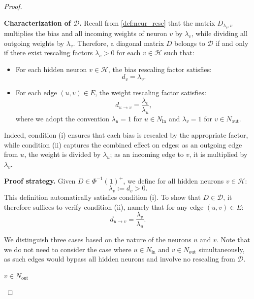 \documentclass{article}
\theoremstyle{plain}
\theoremstyle{definition}
\theoremstyle{remark}
\def\Dcal{\mathcal{D}}
\def\Dcal{{\mathcal{D}}}
\begin{document}
{\begin{proof}
\begin{itemize}
{\textbf{Characterization of $\Dcal$.} Recall from \cref{def:neur_resc} that the matrix $D_{\lambda_v, v}$ multiplies the bias and all incoming weights of neuron $v$ by $\lambda_v$, while dividing all outgoing weights by $\lambda_v$. Therefore, a diagonal matrix $D$ belongs to $\Dcal$ if and only if there exist rescaling factors $\lambda_v > 0$ for each $v \in \mathcal{H}$ such that:
\begin{itemize}
    \item[(i)] For each hidden neuron $v \in \mathcal{H}$, the bias rescaling factor satisfies:
    \begin{equation}
        d_v = \lambda_v.
    \end{equation}
    \item[(ii)] For each edge $(u,v) \in E$, the weight rescaling factor satisfies:
    \begin{equation}
    \label{eq:edge_condition}
        d_{u \rightarrow v} = \frac{\lambda_v}{\lambda_u},
    \end{equation}
    where we adopt the convention $\lambda_u = 1$ for $u \in N_{\text{in}}$ and $\lambda_v = 1$ for $v \in N_{\text{out}}$.
\end{itemize}

Indeed, condition (i) ensures that each bias is rescaled by the appropriate factor, while condition (ii) captures the combined effect on edges: as an outgoing edge from $u$, the weight is divided by $\lambda_u$; as an incoming edge to $v$, it is multiplied by $\lambda_v$.

\textbf{Proof strategy.} Given $D \in \Phi^{-1}(\mathbf{1})^+$, we define for all hidden neurons $v \in \mathcal{H}$:
\begin{equation}
    \lambda_v := d_v > 0.
\end{equation}
This definition automatically satisfies condition (i). To show that $D \in \Dcal$, it therefore suffices to verify condition (ii), namely that for any edge $(u,v) \in E$:
\begin{equation}
\label{eq:edge_rescaling}
    d_{u \rightarrow v} = \frac{\lambda_v}{\lambda_u}.
\end{equation}

We distinguish three cases based on the nature of the neurons $u$ and $v$. Note that we do not need to consider the case where $u \in N_{\text{in}}$ and $v \in N_{\text{out}}$ simultaneously, as such edges would bypass all hidden neurons and involve no rescaling from $\Dcal$.

\medskip
\noindent{} \textbf{$v \in N_{\text{out}}$}

}
\end{itemize}
\end{proof}}
\end{document}
